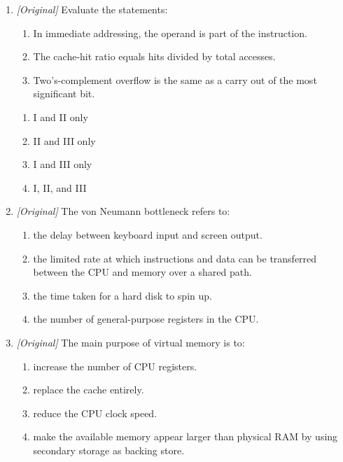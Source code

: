 \documentclass[11pt]{article}
\begin{document}
\begin{enumerate}[label=\textbf{Q\arabic*.}, leftmargin=*]
in BCD?
  \begin{enumerate}[label=\Alph*.]
    \item $0101$
    \item $1001$
    \item $101$
    \item $1110$
  \end{enumerate}
\item \textit{[Original]} Evaluate the statements:
  \begin{enumerate}[label=\Roman*.]
    \item In immediate addressing, the operand is part of the instruction.
    \item The cache-hit ratio equals hits divided by total accesses.
    \item Two's-complement overflow is the same as a carry out of the most
      significant bit.
  \end{enumerate}
  \begin{enumerate}[label=\Alph*.]
    \item I and II only
    \item II and III only
    \item I and III only
    \item I, II, and III
  \end{enumerate}
\item \textit{[Original]} The von Neumann bottleneck refers to:
  \begin{enumerate}[label=\Alph*.]
    \item the delay between keyboard input and screen output.
    \item the limited rate at which instructions and data can be transferred
      between the CPU and memory over a shared path.
    \item the time taken for a hard disk to spin up.
    \item the number of general-purpose registers in the CPU.
  \end{enumerate}
\item \textit{[Original]} The main purpose of virtual memory is to:
  \begin{enumerate}[label=\Alph*.]
    \item increase the number of CPU registers.
    \item replace the cache entirely.
    \item reduce the CPU clock speed.
    \item make the available memory appear larger than physical RAM by using
      secondary storage as backing store.
  \end{enumerate}


\end{enumerate}
\end{document}
